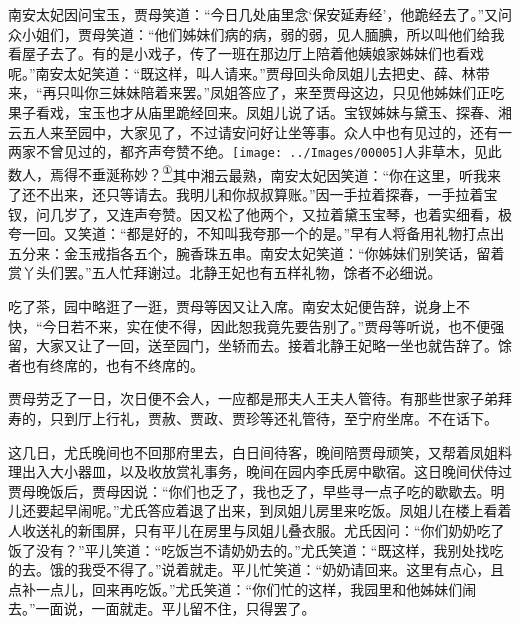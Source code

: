 南安太妃因问宝玉，贾母笑道：``今日几处庙里念`保安延寿经'，他跪经去了。''又问众小姐们，贾母笑道：``他们姊妹们病的病，弱的弱，见人腼腆，所以叫他们给我看屋子去了。有的是小戏子，传了一班在那边厅上陪着他姨娘家姊妹们也看戏呢。''南安太妃笑道：``既这样，叫人请来。''贾母回头命凤姐儿去把史、薛、林带来，``再只叫你三妹妹陪着来罢。''凤姐答应了，来至贾母这边，只见他姊妹们正吃果子看戏，宝玉也才从庙里跪经回来。凤姐儿说了话。宝钗姊妹与黛玉、探春、湘云五人来至园中，大家见了，不过请安问好让坐等事。众人中也有见过的，还有一两家不曾见过的，都齐声夸赞不绝。{\texttt{[image: ../Images/00005]}\kaishu 人非草木，见此数人，焉得不垂涎称妙？}\href{../Text/part0075_split_000.html\#lnkback_1_a}{\textsuperscript{①}}其中湘云最熟，南安太妃因笑道：``你在这里，听我来了还不出来，还只等请去。我明儿和你叔叔算账。''因一手拉着探春，一手拉着宝钗，问几岁了，又连声夸赞。因又松了他两个，又拉着黛玉宝琴，也着实细看，极夸一回。又笑道：``都是好的，不知叫我夸那一个的是。''早有人将备用礼物打点出五分来：金玉戒指各五个，腕香珠五串。南安太妃笑道：``你姊妹们别笑话，留着赏丫头们罢。''五人忙拜谢过。北静王妃也有五样礼物，馀者不必细说。

吃了茶，园中略逛了一逛，贾母等因又让入席。南安太妃便告辞，说身上不快，``今日若不来，实在使不得，因此恕我竟先要告别了。''贾母等听说，也不便强留，大家又让了一回，送至园门，坐轿而去。接着北静王妃略一坐也就告辞了。馀者也有终席的，也有不终席的。

贾母劳乏了一日，次日便不会人，一应都是邢夫人王夫人管待。有那些世家子弟拜寿的，只到厅上行礼，贾赦、贾政、贾珍等还礼管待，至宁府坐席。不在话下。

这几日，尤氏晚间也不回那府里去，白日间待客，晚间陪贾母顽笑，又帮着凤姐料理出入大小器皿，以及收放赏礼事务，晚间在园内李氏房中歇宿。这日晚间伏侍过贾母晚饭后，贾母因说：``你们也乏了，我也乏了，早些寻一点子吃的歇歇去。明儿还要起早闹呢。''尤氏答应着退了出来，到凤姐儿房里来吃饭。凤姐儿在楼上看着人收送礼的新围屏，只有平儿在房里与凤姐儿叠衣服。尤氏因问：``你们奶奶吃了饭了没有？''平儿笑道：``吃饭岂不请奶奶去的。''尤氏笑道：``既这样，我别处找吃的去。饿的我受不得了。''说着就走。平儿忙笑道：``奶奶请回来。这里有点心，且点补一点儿，回来再吃饭。''尤氏笑道：``你们忙的这样，我园里和他姊妹们闹去。''一面说，一面就走。平儿留不住，只得罢了。

